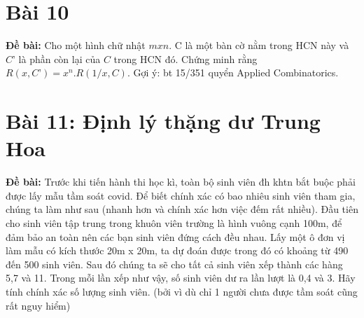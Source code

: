 \documentclass[12pt]{article}
\begin{document}
\begin{sloppypar}
\section{Bài 10}
\begin{tcolorbox}
    \textbf{Đề bài:} Cho một hình chữ nhật \(mxn\). C là một bàn cờ nằm trong HCN này và \(C’\) là phần còn lại của \(C\) trong HCN đó.
    Chứng minh rằng \(R(x,C’)=x^{n} .R(1/x,C)\). Gợi ý: bt 15/351 quyển Applied Combinatorics.
\end{tcolorbox}

\section{Bài 11: Định lý thặng dư Trung Hoa}
\begin{tcolorbox}
    \textbf{Đề bài:} Trước khi tiến hành thi học kì, toàn bộ sinh viên đh khtn bắt buộc phải được lấy mẫu tầm soát covid. Để biết chính xác có bao nhiêu sinh viên tham gia, chúng ta làm như sau (nhanh hơn và chính xác hơn việc đếm rất nhiều).
    Đầu tiên cho sinh viên tập trung trong khuôn viên trường là hình vuông cạnh 100m, để đảm bảo an toàn nên các bạn sinh viên đứng cách đều nhau. Lấy một ô đơn vị làm mẫu có kích thước 20m x 20m, ta dự đoán được trong đó có khoảng từ 490 đến 500 sinh viên. Sau đó chúng ta sẽ cho tất cả sinh viên xếp thành các hàng 5,7 và 11. Trong mỗi lần xếp như vậy, số sinh viên dư ra lần lượt là 0,4 và 3. Hãy tính chính xác số lượng sinh viên. (bởi vì dù chỉ 1 người chưa được tầm soát cũng rất nguy hiểm)
\end{tcolorbox}
\end{sloppypar}
\end{document}
